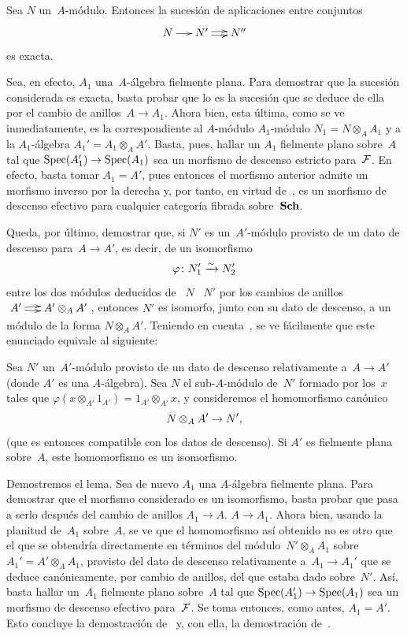 \begin{corollaire}
\label{VIII.1.5}
Sea $N$ un~$A$-módulo. Entonces la sucesión de aplicaciones entre
conjuntos
$$
\xymatrix@C=.5cm{N\ar[r] & N'\ar@/^2pt/[r]\ar@/_2pt/[r] & N''}
$$
es exacta.
\end{corollaire}

Sea, en efecto, $A_{1}$ una~$A$-álgebra fielmente plana. Para demostrar
que la sucesión considerada es exacta, basta probar que lo es la sucesión
que se deduce de ella por el cambio de anillos~$A\to A_{1}$. Ahora bien,
esta última, como se ve inmediatamente, es la correspondiente al
{$A$-módulo}
{$A_1$-módulo}
$N_{1}=N\otimes_{A}A_{1}$ y a la $A_{1}$-álgebra
$A_{1}'=A_{1}\otimes_{A}A'$. Basta, pues, hallar un $A_{1}$ fielmente
plano sobre~$A$ tal que $\Spec(A_{1}')\to \Spec(A_{1})$ sea un morfismo
de descenso estricto para~$\cal{F}$. En efecto, basta tomar $A_{1}=A'$,
pues entonces el morfismo anterior admite un morfismo inverso por la derecha y,
por tanto, en virtud de~\cite{VIII.D}, es un morfismo de descenso efectivo
para cualquier categoría fibrada sobre~$\Sch$.

Queda, por último, demostrar que, si $N'$ es un~$A'$-módulo provisto de
un dato de descenso para~$A\to A'$, es decir, de un isomorfismo
$$
\varphi\colon N_{1}'\isomto N_{2}'
$$
entre los dos módulos deducidos de
{~$N$}
{~$N'$}
por los cambios de anillos
$\xymatrix@C=.5cm{A'\ar@/^2pt/[r]\ar@/_2pt/[r] & A'\otimes_{A}A'}$,
entonces
$N'$ es isomorfo, junto con su dato de descenso, a un módulo de la forma
$N\otimes_{A}A'$. Teniendo en cuenta~, se ve fácilmente
que este enunciado equivale al siguiente:

\begin{lemme}
\label{VIII.1.6}
Sea $N'$ un~$A'$-módulo provisto de un dato de descenso relativamente
a~$A\to A'$ (donde $A'$ es una $A$-álgebra). Sea $N$ el sub-$A$-módulo
de~$N'$ formado por los~$x$ tales que
$\varphi(x\otimes_{A'}1_{A'})=1_{A'}\otimes_{A'}x$, y consideremos el
homomorfismo canónico
$$
N\otimes_{A}A'\to N'\quoi,
$$
(que es entonces compatible con los datos de descenso). Si $A'$ es
fielmente plana sobre~$A$, este homomorfismo es un isomorfismo.
\end{lemme}

Demostremos el lema. Sea de nuevo $A_{1}$ una $A$-álgebra fielmente
plana. Para demostrar que el morfismo considerado es un isomorfismo,
basta probar que pasa a serlo después del cambio de anillos
{$A_{1}\to A$.}
{$A\to A_1$.}
Ahora bien, usando la planitud de~$A_{1}$ sobre~$A$, se ve que el
homomorfismo así obtenido no es otro que el que se obtendría directamente
en términos del módulo~$N'\otimes_{A}A_{1}$
sobre~$A_{1}'=A'\otimes_{A}A_{1}$, provisto del dato de descenso relativamente
a~$A_{1}\to A_{1}'$ que se deduce canónicamente, por cambio de anillos,
del que estaba dado sobre~$N'$. Así, basta hallar un~$A_{1}$ fielmente
plano sobre~$A$ tal que $\Spec(A_{1}')\to \Spec(A_{1})$ sea un morfismo
de descenso efectivo para~$\cal{F}$. Se toma entonces, como antes,
$A_{1}=A'$. Esto concluye la demostración de~ y, con ella,
la demostración de~.

